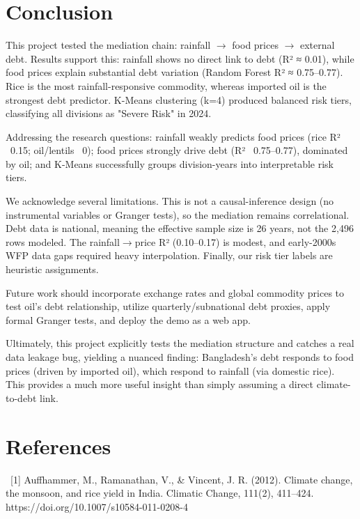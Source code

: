 \documentclass[12pt,a4paper]{article}
\begin{document}
\clearpage
\section{Conclusion}

This project tested the mediation chain: rainfall $\rightarrow$ food prices $\rightarrow$ external debt. Results support this: rainfall shows no direct link to debt (R² ≈ 0.01), while food prices explain substantial debt variation (Random Forest R² ≈ 0.75--0.77). Rice is the most rainfall-responsive commodity, whereas imported oil is the strongest debt predictor. K-Means clustering (k=4) produced balanced risk tiers, classifying all divisions as "Severe Risk" in 2024.

Addressing the research questions: rainfall weakly predicts food prices (rice R² ~0.15; oil/lentils ~0); food prices strongly drive debt (R² ~0.75--0.77), dominated by oil; and K-Means successfully groups division-years into interpretable risk tiers.

We acknowledge several limitations. This is not a causal-inference design (no instrumental variables or Granger tests), so the mediation remains correlational. Debt data is national, meaning the effective sample size is 26 years, not the 2,496 rows modeled. The rainfall$\rightarrow$price R² (0.10--0.17) is modest, and early-2000s WFP data gaps required heavy interpolation. Finally, our risk tier labels are heuristic assignments.

Future work should incorporate exchange rates and global commodity prices to test oil's debt relationship, utilize quarterly/subnational debt proxies, apply formal Granger tests, and deploy the demo as a web app.

Ultimately, this project explicitly tests the mediation structure and catches a real data leakage bug, yielding a nuanced finding: Bangladesh's debt responds to food prices (driven by imported oil), which respond to rainfall (via domestic rice). This provides a much more useful insight than simply assuming a direct climate-to-debt link.

\clearpage
\section*{References}

~[1] Auffhammer, M., Ramanathan, V., \& Vincent, J. R. (2012). Climate change, the monsoon, and rice yield in India. Climatic Change, 111(2), 411--424. https://doi.org/10.1007/s10584-011-0208-4
\end{document}
